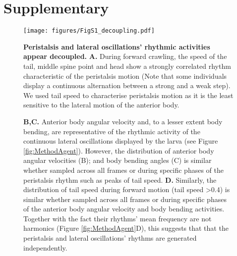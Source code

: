 



\section{Supplementary}
\beginsupplement


\begin{figure}
\begin{center}
\texttt{[image: figures/FigS1\_decoupling.pdf]}
\caption{{\bf Peristalsis and lateral oscillations’ rhythmic activities appear decoupled.} {\bf A.} During forward crawling, the speed of the tail, middle spine point and head show a strongly correlated rhythm characteristic of the peristalsis motion (Note that some individuals display a continuous alternation between a strong and a weak step). We used tail speed to characterise peristalsis motion as it is the least sensitive to the lateral motion of the anterior body.
 \label{fig:FigS2}}
\end{center}
\end{figure}



\begin{figure}
\ContinuedFloat
\caption{
{\bf B,C.} Anterior body angular velocity and, to a lesser extent body bending, are representative of the rhythmic activity of the continuous lateral oscillations displayed by the larva (see Figure \ref{fig:MethodAgent}). However, the distribution of anterior body angular velocities (B); and body bending angles (C) is similar whether sampled across all frames or during specific phases of the peristalsis rhythm such as peaks of tail speed. {\bf D.} Similarly, the distribution of tail speed during forward motion (tail speed >0.4) is similar whether sampled across all frames or during specific phases of the anterior body angular velocity and body bending activities. Together with the fact their rhythms’ mean frequency are not harmonics (Figure \ref{fig:MethodAgent}D), this suggests that that the peristalsis and lateral oscillations’ rhythms are generated independently.
\label{fig:FigS2}}
\end{figure}





